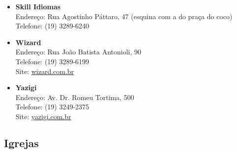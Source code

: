 \begin{itemize}
    \item   \textbf{Skill Idiomas}
        \\Endereço: Rua Agostinho Páttaro, 47 (esquina com a do praça do coco)
        \\Telefone: (19) 3289-6240

    \item   \textbf{Wizard}
        \\Endereço: Rua João Batista Antonioli, 90
        \\Telefone: (19) 3289-6199
        \\Site: \url{wizard.com.br}

    \item   \textbf{Yazigi}
        \\Endereço: Av. Dr. Romeu Tortima, 500
        \\Telefone: (19) 3249-2375
        \\Site: \url{yazigi.com.br}
\end{itemize}

\subsection{Igrejas}

